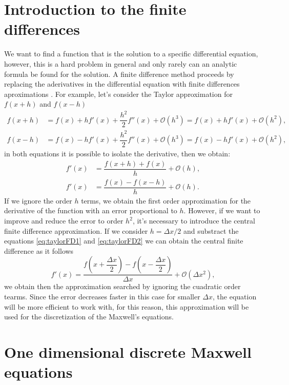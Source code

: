 \documentclass[12pt, oneside]{book}
\begin{document}
\section{Introduction to the finite differences}

We want to find a function that is the solution to a specific differential equation, however, this is a hard problem in general and only rarely can an analytic formula be found for the solution. A finite difference method proceeds by replacing the aderivatives in the differential equation with finite differences aproximations \cite{LeVeque,Burden-2016}. For example, let's consider the Taylor approximation for $f(x+h)$ and $f(x-h)$
\begin{align}
    f(x+h) &= f(x) + h  f'(x) + \dfrac{h^2}{2}f''(x) + \mathcal{O}(h^3) = f(x) + h  f'(x) + \mathcal{O}(h^2), \label{eq:taylorFD1}\\
    f(x-h) &= f(x) - h  f'(x) + \dfrac{h^2}{2}f''(x) + \mathcal{O}(h^3) = f(x) - h  f'(x) + \mathcal{O}(h^2),
    \label{eq:taylorFD2}
\end{align}
in both equations it is possible to isolate the derivative, then we obtain:
\begin{align}
    f'(x) &= \dfrac{f(x+h)+f(x)}{h} + \mathcal{O}(h), \\
    f'(x) &= \dfrac{f(x)-f(x-h)}{h} + \mathcal{O}(h).
\end{align}
If we ignore the order $h$ terms, we obtain the first order approximation for the derivative of the function with an error proportional to $h$. However, if we want to improve and reduce the error to order $h^2$, it's necessary to introduce the central finite difference approximation. If we consider $h=\Delta x/2$ and substract the equations \ref{eq:taylorFD1} and \ref{eq:taylorFD2} we can obtain the central finite difference as it follows
\begin{equation}
    f'(x) = \dfrac{f\left( x+ \dfrac{\Delta x}{2} \right) - f\left( x - \dfrac{\Delta x}{2} \right)}{\Delta x} + \mathcal{O}(\Delta x^2),
\end{equation}
we obtain then the approximation searched by ignoring the cuadratic order tearms. Since the error decreases faster in this case for smaller $\Delta x$, the equation will be more efficient to work with, for this reason, this approximation will be used for the discretization of the Maxwell's equations.

\section{One dimensional discrete Maxwell equations}
\end{document}
